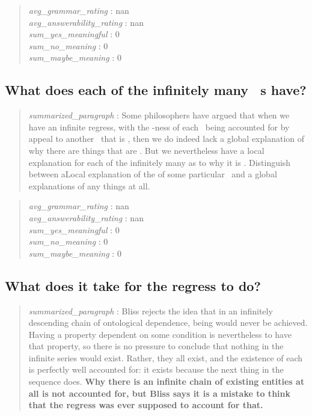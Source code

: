 \begin{quote}
\emph{avg\_grammar\_rating} : nan\\
\emph{avg\_answerability\_rating} : nan\\
\emph{sum\_yes\_meaningful} : 0\\
\emph{sum\_no\_meaning} : 0\\
\emph{sum\_maybe\_meaning} : 0
\end{quote}

\hypertarget{what-does-each-of-the-infinitely-many-s-have}{%
\subsection{What does each of the infinitely many ~s
have?}\label{what-does-each-of-the-infinitely-many-s-have}}

\begin{quote}
\emph{summarized\_paragraph} : Some philosophers have argued that when
we have an infinite regress, with the -ness of each ~being accounted for
by appeal to another ~that is , then we do indeed lack a global
explanation of why there are things that are . But we nevertheless have
a local explanation for each of the infinitely many \s as to why it is .
Distinguish between aLocal explanation of the of some particular ~and a
global explanations of any things at all.
\end{quote}

\begin{quote}
\emph{avg\_grammar\_rating} : nan\\
\emph{avg\_answerability\_rating} : nan\\
\emph{sum\_yes\_meaningful} : 0\\
\emph{sum\_no\_meaning} : 0\\
\emph{sum\_maybe\_meaning} : 0
\end{quote}

\hypertarget{what-does-it-take-for-the-regress-to-do}{%
\subsection{What does it take for the regress to
do?}\label{what-does-it-take-for-the-regress-to-do}}

\begin{quote}
\emph{summarized\_paragraph} : Bliss rejects the idea that in an
infinitely descending chain of ontological dependence, being would never
be achieved. Having a property dependent on some condition is
nevertheless to have that property, so there is no pressure to conclude
that nothing in the infinite series would exist. Rather, they all exist,
and the existence of each is perfectly well accounted for: it exists
because the next thing in the sequence does. \textbf{Why there is an
infinite chain of existing entities at all is not accounted for, but
Bliss says it is a mistake to think that the regress was ever supposed
to account for that.}
\end{quote}

